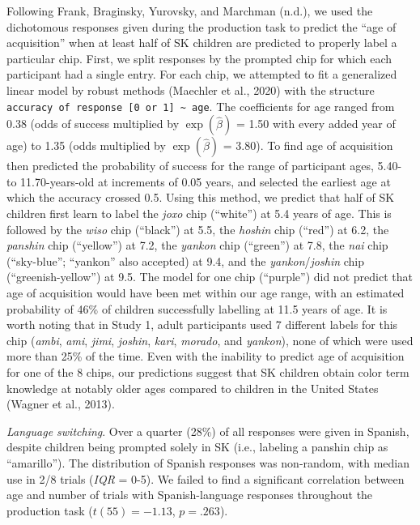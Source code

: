 \documentclass[
  english,
  ,man,floatsintext]{apa6}
\begin{document}
Following Frank, Braginsky, Yurovsky, and Marchman (n.d.), we used the dichotomous responses given during the production task to predict the \enquote{age of acquisition} when at least half of SK children are predicted to properly label a particular chip. First, we split responses by the prompted chip for which each participant had a single entry. For each chip, we attempted to fit a generalized linear model by robust methods (Maechler et al., 2020) with the structure \texttt{accuracy\ of\ response\ {[}0\ or\ 1{]}\ \textasciitilde{}\ age}. The coefficients for age ranged from 0.38 (odds of success multiplied by \(\exp{(\hat{\beta})}\) = 1.50 with every added year of age) to 1.35 (odds multiplied by \(\exp{(\hat{\beta})}\) = 3.80). To find age of acquisition then predicted the probability of success for the range of participant ages, 5.40- to 11.70-years-old at increments of 0.05 years, and selected the earliest age at which the accuracy crossed 0.5. Using this method, we predict that half of SK children first learn to label the \emph{joxo} chip (\enquote{white}) at 5.4 years of age. This is followed by the \emph{wiso} chip (\enquote{black}) at 5.5, the \emph{hoshin} chip (\enquote{red}) at 6.2, the \emph{panshin} chip (\enquote{yellow}) at 7.2, the \emph{yankon} chip (\enquote{green}) at 7.8, the \emph{nai} chip (\enquote{sky-blue}; \enquote{yankon} also accepted) at 9.4, and the \emph{yankon}/\emph{joshin} chip (\enquote{greenish-yellow}) at 9.5. The model for one chip (\enquote{purple}) did not predict that age of acquisition would have been met within our age range, with an estimated probability of 46\% of children successfully labelling at 11.5 years of age. It is worth noting that in Study 1, adult participants used 7 different labels for this chip (\emph{ambi}, \emph{ami}, \emph{jimi}, \emph{joshin}, \emph{kari}, \emph{morado}, and \emph{yankon}), none of which were used more than 25\% of the time. Even with the inability to predict age of acquisition for one of the 8 chips, our predictions suggest that SK children obtain color term knowledge at notably older ages compared to children in the United States (Wagner et al., 2013).

\emph{Language switching}. Over a quarter (28\%) of all responses were given in Spanish, despite children being prompted solely in SK (i.e., labeling a panshin chip as \enquote{amarillo}). The distribution of Spanish responses was non-random, with median use in 2/8 trials (\emph{IQR} = 0-5). We failed to find a significant correlation between age and number of trials with Spanish-language responses throughout the production task (\(t(55) = -1.13\), \(p = .263\)).
\end{document}
